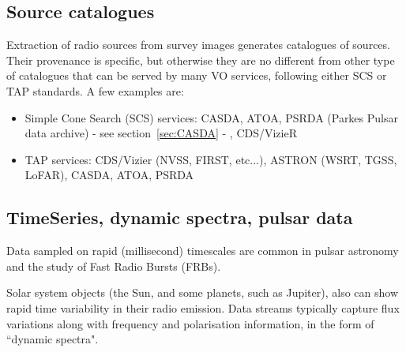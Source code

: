 \documentclass[11pt,a4paper]{ivoatex/ivoa}
\begin{document}
\subsection{Source catalogues}
Extraction of radio sources from survey images generates catalogues of sources. Their provenance is 
specific, but otherwise they are no different from other type of catalogues that can be served by many 
VO services, following either SCS \citep{std:SCS} or TAP standards. A few examples are:
\begin{itemize}
\item Simple Cone Search (SCS) services: CASDA, ATOA, PSRDA (Parkes Pulsar data archive) - see 
section~\ref{sec:CASDA} - , CDS/VizieR
\item TAP services: CDS/Vizier (NVSS, FIRST, etc...), ASTRON (WSRT, TGSS, LoFAR), CASDA, ATOA, PSRDA 
\end{itemize}


\subsection{TimeSeries, dynamic spectra, pulsar data}

Data sampled on rapid (millisecond) timescales are common in pulsar astronomy and the study of Fast 
Radio Bursts (FRBs). 

Solar system objects (the Sun, and some planets, such as Jupiter), also can show 
rapid time variability in their radio emission. Data streams typically capture flux variations along 
with frequency and polarisation information, in the form of ``dynamic spectra".
\end{document}
